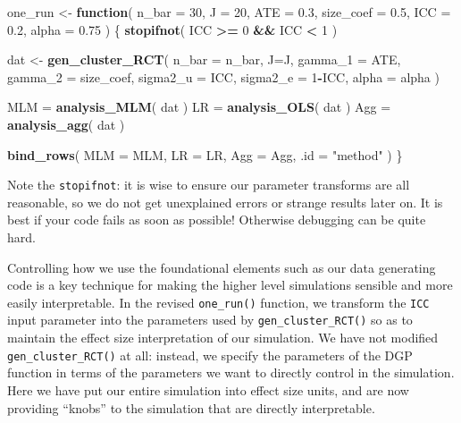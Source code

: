 \documentclass[
]{book}
\newenvironment{Shaded}{\begin{snugshade}}{\end{snugshade}}
\newcommand{\AttributeTok}[1]{\textcolor[rgb]{0.13,0.29,0.53}{#1}}
\newcommand{\ControlFlowTok}[1]{\textcolor[rgb]{0.13,0.29,0.53}{\textbf{#1}}}
\newcommand{\DecValTok}[1]{\textcolor[rgb]{0.00,0.00,0.81}{#1}}
\newcommand{\FloatTok}[1]{\textcolor[rgb]{0.00,0.00,0.81}{#1}}
\newcommand{\FunctionTok}[1]{\textcolor[rgb]{0.13,0.29,0.53}{\textbf{#1}}}
\newcommand{\NormalTok}[1]{#1}
\newcommand{\OtherTok}[1]{\textcolor[rgb]{0.56,0.35,0.01}{#1}}
\newcommand{\SpecialCharTok}[1]{\textcolor[rgb]{0.81,0.36,0.00}{\textbf{#1}}}
\newcommand{\StringTok}[1]{\textcolor[rgb]{0.31,0.60,0.02}{#1}}
\begin{document}
\begin{Shaded}
\begin{Highlighting}[]
\NormalTok{one\_run }\OtherTok{\textless{}{-}} \ControlFlowTok{function}\NormalTok{( }
  \AttributeTok{n\_bar =} \DecValTok{30}\NormalTok{, }\AttributeTok{J =} \DecValTok{20}\NormalTok{, }\AttributeTok{ATE =} \FloatTok{0.3}\NormalTok{, }\AttributeTok{size\_coef =} \FloatTok{0.5}\NormalTok{,}
  \AttributeTok{ICC =} \FloatTok{0.2}\NormalTok{, }\AttributeTok{alpha =} \FloatTok{0.75} 
\NormalTok{) \{}
  \FunctionTok{stopifnot}\NormalTok{( ICC }\SpecialCharTok{\textgreater{}=} \DecValTok{0} \SpecialCharTok{\&\&}\NormalTok{ ICC }\SpecialCharTok{\textless{}} \DecValTok{1}\NormalTok{ )}

\NormalTok{  dat }\OtherTok{\textless{}{-}} \FunctionTok{gen\_cluster\_RCT}\NormalTok{( }
    \AttributeTok{n\_bar =}\NormalTok{ n\_bar, }\AttributeTok{J=}\NormalTok{J, }\AttributeTok{gamma\_1 =}\NormalTok{ ATE, }\AttributeTok{gamma\_2 =}\NormalTok{ size\_coef,}
    \AttributeTok{sigma2\_u =}\NormalTok{ ICC, }\AttributeTok{sigma2\_e =} \DecValTok{1}\SpecialCharTok{{-}}\NormalTok{ICC, }\AttributeTok{alpha =}\NormalTok{ alpha }
\NormalTok{  )}
  
\NormalTok{  MLM }\OtherTok{=} \FunctionTok{analysis\_MLM}\NormalTok{( dat )}
\NormalTok{  LR }\OtherTok{=} \FunctionTok{analysis\_OLS}\NormalTok{( dat )}
\NormalTok{  Agg }\OtherTok{=} \FunctionTok{analysis\_agg}\NormalTok{( dat )}
  
  \FunctionTok{bind\_rows}\NormalTok{( }\AttributeTok{MLM =}\NormalTok{ MLM, }\AttributeTok{LR =}\NormalTok{ LR, }\AttributeTok{Agg =}\NormalTok{ Agg, }\AttributeTok{.id =} \StringTok{"method"}\NormalTok{ )}
\NormalTok{\}}
\end{Highlighting}
\end{Shaded}

Note the \texttt{stopifnot}: it is wise to ensure our parameter transforms are all reasonable, so we do not get unexplained errors or strange results later on.
It is best if your code fails as soon as possible! Otherwise debugging can be quite hard.

Controlling how we use the foundational elements such as our data generating code is a key technique for making the higher level simulations sensible and more easily interpretable.
In the revised \texttt{one\_run()} function, we transform the \texttt{ICC} input parameter into the parameters used by \texttt{gen\_cluster\_RCT()} so as to maintain the effect size interpretation of our simulation.
We have not modified \texttt{gen\_cluster\_RCT()} at all: instead, we specify the parameters of the DGP function in terms of the parameters we want to directly control in the simulation.
Here we have put our entire simulation into effect size units, and are now providing ``knobs'' to the simulation that are directly interpretable.
\end{document}
